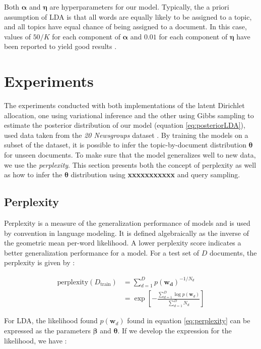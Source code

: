 \documentclass{article}
\begin{document}
Both $\bm{\alpha}$ and $\bm{\eta}$ are hyperparameters for our model. Typically, the a priori assumption of LDA is that all words are equally likely to be assigned to a topic, and all topics have equal chance of being assigned to a document. In this case, values of $50/K$ for each component of $\bm{\alpha}$ and $0.01$ for each component of $\bm{\eta}$ have been reported to yield good results \cite{griffiths2004finding}.

\section{Experiments}
The experiments conducted with both implementations of the latent Dirichlet allocation, one using variational inference and the other using Gibbs sampling to estimate the posterior distribution of our model (equation \ref{eq:posteriorLDA}), used data taken from the \textit{20 Newsgroups} dataset \cite{20_newsgroups}. By training the models on a subset of the dataset, it is possible to infer the topic-by-document distribution $\bm{\theta}$ for unseen documents. To make sure that the model generalizes well to new data, we use the \textit{perplexity}. This section presents both the concept of perplexity as well as how to infer the $\bm{\theta}$ distribution using \textbf{xxxxxxxxxxx} and query sampling.

\subsection{Perplexity}

Perplexity is a measure of the generalization performance of models and is used by convention in language modeling. It is defined algebraically as the inverse of the geometric mean per-word likelihood. A lower perplexity score indicates a better generalization performance for a model. For a test set of $D$ documents, the perplexity is given by :

\begin{align}\label{eq:perplexity}
\mathrm{perplexity}(D_{\mathrm{train}}) & = \sum_{d=1}^{D} p(\mathbf{w_d})^{-1/N_d} \nonumber\\
										& = \exp\left[-\frac{\sum_{d=1}^D \log p(\mathbf{w}_d)}{\sum_{d=1}^D N_d}\right]
\end{align}

For LDA, the likelihood found $p(\mathbf{w}_d)$ found in equation \ref{eq:perplexity} can be expressed as the parameters $\bm{\beta}$ and $\bm{\theta}$. If we develop the expression for the likelihood, we have :
\end{document}
